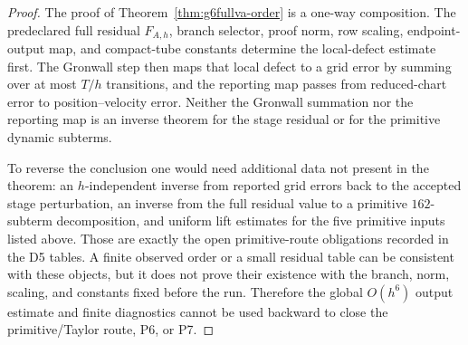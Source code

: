 \documentclass[preprint,12pt]{elsarticle}
\begin{document}
\begin{proof}
The proof of Theorem~\ref{thm:g6fullva-order} is a one-way composition.  The
predeclared full residual \(F_{A,h}\), branch selector, proof norm, row
scaling, endpoint-output map, and compact-tube constants determine the
local-defect estimate first.  The Gronwall step then maps that local defect to
a grid error by summing over at most \(T/h\) transitions, and the reporting map
passes from reduced-chart error to position--velocity error.  Neither the
Gronwall summation nor the reporting map is an inverse theorem for the stage
residual or for the primitive dynamic subterms.

To reverse the conclusion one would need additional data not present in the
theorem: an \(h\)-independent inverse from reported grid errors back to the
accepted stage perturbation, an inverse from the full residual value to a
primitive \(162\)-subterm decomposition, and uniform lift estimates for the
five primitive inputs listed above.  Those are exactly the open
primitive-route obligations recorded in the D5 tables.  A finite observed
order or a small residual table can be consistent with these objects, but it
does not prove their existence with the branch, norm, scaling, and constants
fixed before the run.  Therefore the global \(O(h^6)\) output estimate and
finite diagnostics cannot be used backward to close the primitive/Taylor
route, P6, or P7.
\end{proof}
\end{document}
